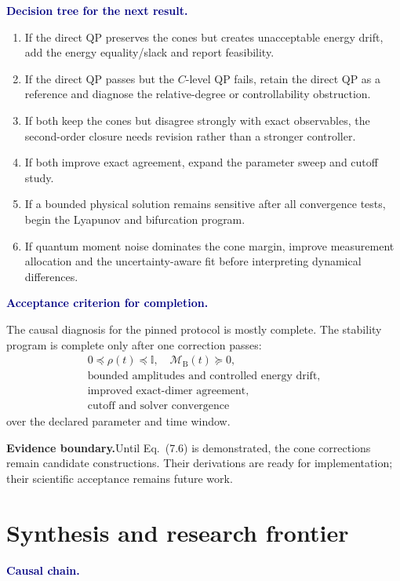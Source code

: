 \documentclass[10pt]{article}
\newcommand{\I}{\mathbb I}
\newcommand{\MB}{\mathcal M_{\mathrm B}}
\newcommand{\warningbox}[1]{%
  \par\medskip
  \noindent\colorbox{palered}{%
    \parbox{\dimexpr\linewidth-2\fboxsep\relax}{%
      \textcolor{brick}{\textbf{Evidence boundary.}}\quad #1%
    }%
  }\par\medskip
}
\newcommand{\flowlead}[1]{%
  \par\medskip
  \needspace{3\baselineskip}%
  \noindent\textcolor{navy}{\textbf{#1.}}\enspace\ignorespaces
}
\begin{document}
\flowlead{Decision tree for the next result}

\begin{enumerate}
  \item If the direct QP preserves the cones but creates unacceptable energy
  drift, add the energy equality/slack and report feasibility.
  \item If the direct QP passes but the \(C\)-level QP fails, retain the direct
  QP as a reference and diagnose the relative-degree or controllability
  obstruction.
  \item If both keep the cones but disagree strongly with exact observables,
  the second-order closure needs revision rather than a stronger controller.
  \item If both improve exact agreement, expand the parameter sweep and
  cutoff study.
  \item If a bounded physical solution remains sensitive after all
  convergence tests, begin the Lyapunov and bifurcation program.
  \item If quantum moment noise dominates the cone margin, improve measurement
  allocation and the uncertainty-aware fit before interpreting dynamical
  differences.
\end{enumerate}

\flowlead{Acceptance criterion for completion}

The causal diagnosis for the pinned protocol is mostly complete.  The
stability program is complete only after one correction passes:
\[
\boxed{
\begin{gathered}
0\preceq\rho(t)\preceq\I,\quad \MB(t)\succeq0,\\
\text{bounded amplitudes and controlled energy drift},\\
\text{improved exact-dimer agreement},\\
\text{cutoff and solver convergence}
\end{gathered}}
\tag{7.6}
\]
over the declared parameter and time window.

\warningbox{Until Eq.~(7.6) is demonstrated, the cone corrections remain
candidate constructions.  Their derivations are ready for implementation;
their scientific acceptance remains future work.}

\part{Synthesis and research frontier}

\flowlead{Causal chain}
\end{document}
